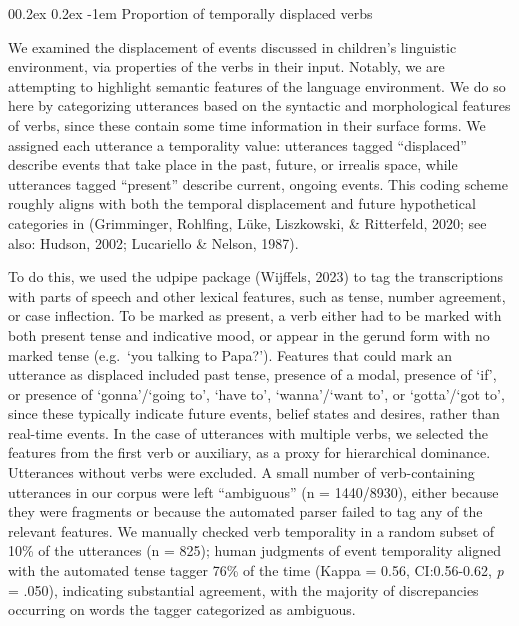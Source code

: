 \documentclass[
  man,floatsintext]{apa6}
\makeatletter
\let\oldparagraph\paragraph
\renewcommand{\paragraph}[1]{\oldparagraph{#1}\mbox{}}
\renewcommand{\paragraph}{\@startsection{paragraph}{4}{\parindent}%
  {0\baselineskip \@plus 0.2ex \@minus 0.2ex}%
  {-1em}%
  {\normalfont\normalsize\bfseries\itshape\typesectitle}}
\makeatother
\begin{document}
\hypertarget{proportion-of-temporally-displaced-verbs}{%
\paragraph{Proportion of temporally displaced verbs}\label{proportion-of-temporally-displaced-verbs}}

We examined the displacement of events discussed in children's linguistic environment, via properties of the verbs in their input. Notably, we are attempting to highlight semantic features of the language environment. We do so here by categorizing utterances based on the syntactic and morphological features of verbs, since these contain some time information in their surface forms. We assigned each utterance a temporality value: utterances tagged ``displaced'' describe events that take place in the past, future, or irrealis space, while utterances tagged ``present'' describe current, ongoing events. This coding scheme roughly aligns with both the temporal displacement and future hypothetical categories in (Grimminger, Rohlfing, Lüke, Liszkowski, \& Ritterfeld, 2020; see also: Hudson, 2002; Lucariello \& Nelson, 1987).

To do this, we used the udpipe package (Wijffels, 2023) to tag the transcriptions with parts of speech and other lexical features, such as tense, number agreement, or case inflection. To be marked as present, a verb either had to be marked with both present tense and indicative mood, or appear in the gerund form with no marked tense (e.g.~`you talking to Papa?'). Features that could mark an utterance as displaced included past tense, presence of a modal, presence of `if', or presence of `gonna'/`going to', `have to', `wanna'/`want to', or `gotta'/`got to', since these typically indicate future events, belief states and desires, rather than real-time events. In the case of utterances with multiple verbs, we selected the features from the first verb or auxiliary, as a proxy for hierarchical dominance. Utterances without verbs were excluded. A small number of verb-containing utterances in our corpus were left ``ambiguous'' (n = 1440/8930), either because they were fragments or because the automated parser failed to tag any of the relevant features. We manually checked verb temporality in a random subset of 10\% of the utterances (n = 825); human judgments of event temporality aligned with the automated tense tagger 76\% of the time (Kappa = 0.56, CI:0.56-0.62, \emph{p} = .050), indicating substantial agreement, with the majority of discrepancies occurring on words the tagger categorized as ambiguous.
\end{document}
